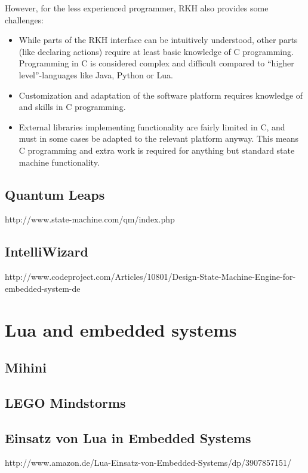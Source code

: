 However, for the less experienced programmer, RKH also provides some challenges:
\begin{itemize}
	\item While parts of the RKH interface can be intuitively understood, other parts (like declaring actions) require at least basic knowledge of C programming. Programming in C is considered complex and difficult compared to “higher level”-languages like Java, Python or Lua.
	\item Customization and adaptation of the software platform requires knowledge of and skills in C programming.
	\item External libraries implementing functionality are fairly limited in C, and must in some cases be adapted to the relevant platform anyway. This means C programming and extra work is required for anything but standard state machine functionality.
\end{itemize}

\subsection{Quantum Leaps}
http://www.state-machine.com/qm/index.php

\subsection{IntelliWizard}
http://www.codeproject.com/Articles/10801/Design-State-Machine-Engine-for-embedded-system-de

\section{Lua and embedded systems}

\subsection{Mihini}

\subsection{LEGO Mindstorms}
\cite{chapter:porting_lua_microcontroller}

\subsection{Einsatz von Lua in Embedded Systems}
http://www.amazon.de/Lua-Einsatz-von-Embedded-Systems/dp/3907857151/

